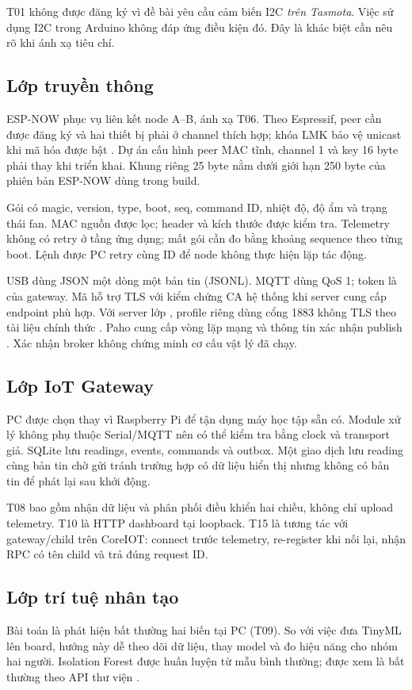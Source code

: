T01 không được đăng ký vì đề bài yêu cầu cảm biến I2C \emph{trên Tasmota}. Việc sử dụng I2C trong Arduino không đáp ứng điều kiện đó. Đây là khác biệt cần nêu rõ khi ánh xạ tiêu chí.

\subsection{Lớp truyền thông}
ESP-NOW phục vụ liên kết node A--B, ánh xạ T06. Theo Espressif, peer cần được đăng ký và hai thiết bị phải ở channel thích hợp; khóa LMK bảo vệ unicast khi mã hóa được bật \cite{espnow}. Dự án cấu hình peer MAC tĩnh, channel 1 và key 16 byte phải thay khi triển khai. Khung riêng 25 byte nằm dưới giới hạn 250 byte của phiên bản ESP-NOW dùng trong build.

Gói có magic, version, type, boot, seq, command ID, nhiệt độ, độ ẩm và trạng thái fan. MAC nguồn được lọc; header và kích thước được kiểm tra. Telemetry không có retry ở tầng ứng dụng; mất gói cần đo bằng khoảng sequence theo từng boot. Lệnh được PC retry cùng ID để node không thực hiện lặp tác động.

USB dùng JSON một dòng một bản tin (JSONL). MQTT dùng QoS 1; token là của gateway. Mã hỗ trợ TLS với kiểm chứng CA hệ thống khi server cung cấp endpoint phù hợp. Với server lớp , profile riêng dùng cổng 1883 không TLS theo tài liệu chính thức \cite{coreiotconnect}. Paho cung cấp vòng lặp mạng và thông tin xác nhận publish \cite{paho}. Xác nhận broker không chứng minh cơ cấu vật lý đã chạy.

\subsection{Lớp IoT Gateway}
PC được chọn thay vì Raspberry Pi để tận dụng máy học tập sẵn có. Module xử lý không phụ thuộc Serial/MQTT nên có thể kiểm tra bằng clock và transport giả. SQLite lưu readings, events, commands và outbox. Một giao dịch lưu reading cùng bản tin chờ gửi tránh trường hợp có dữ liệu hiển thị nhưng không có bản tin để phát lại sau khởi động.

T08 bao gồm nhận dữ liệu và phân phối điều khiển hai chiều, không chỉ upload telemetry. T10 là HTTP dashboard tại loopback. T15 là tương tác với gateway/child trên CoreIOT: connect trước telemetry, re-register khi nối lại, nhận RPC có tên child và trả đúng request ID.

\subsection{Lớp trí tuệ nhân tạo}
Bài toán là phát hiện bất thường hai biến tại PC (T09). So với việc đưa TinyML lên board, hướng này dễ theo dõi dữ liệu, thay model và đo hiệu năng cho nhóm hai người. Isolation Forest được huấn luyện từ mẫu bình thường;  được xem là bất thường theo API thư viện \cite{isolation}.

